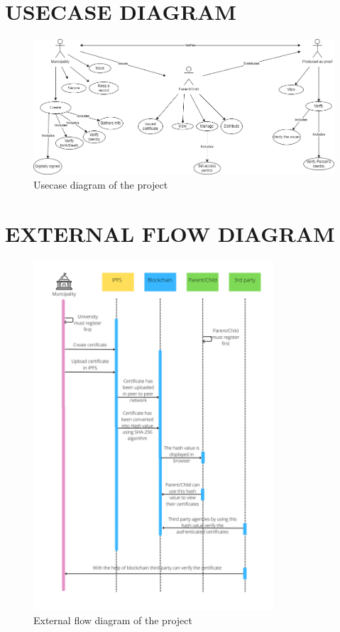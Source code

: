 \vspace{1cm}

    \section{USECASE DIAGRAM}
    \begin{figure}[H]
        \centering
        \includegraphics[width=\textwidth]{imgs/Use_case_diagram.png}
        \caption{Usecase diagram of the project}
        \label{fig:Usecase diagram of the project}
        \end{figure}
    

    \section{EXTERNAL FLOW DIAGRAM}
\begin{figure}[H]
    \centering
    \includegraphics[width=0.80\textwidth]{imgs/External_flow.png}
    \caption{External flow diagram of the project}
    \label{fig:External flow diagram of the project}
    \end{figure}
